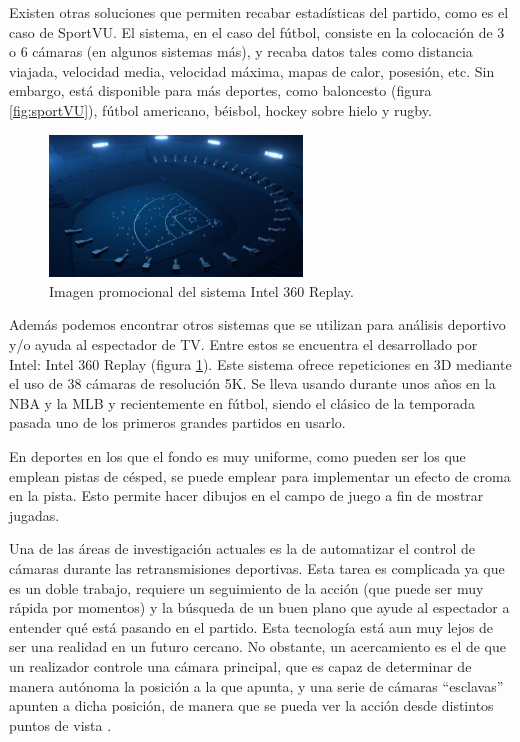 Existen otras soluciones que permiten recabar estadísticas del partido, como es el caso de SportVU. El sistema, en el caso del fútbol, consiste en la colocación de 3 o 6 cámaras (en algunos sistemas más), y recaba datos tales como distancia viajada, velocidad media, velocidad máxima, mapas de calor, posesión, etc. Sin embargo, está disponible para más deportes, como baloncesto  (figura \ref{fig:sportVU}), fútbol americano, béisbol, hockey sobre hielo y rugby.

\begin{figure}
    \centering
    \includegraphics[width=0.6\textwidth]{images/intel360}
    \caption{Imagen promocional del sistema Intel 360 Replay.}
    \label{fig:intel360}
\end{figure}

Además podemos encontrar otros sistemas que se utilizan para análisis deportivo y/o ayuda al espectador de TV. Entre estos se encuentra el desarrollado por Intel: Intel 360 Replay (figura \ref{fig:intel360}). Este sistema ofrece repeticiones en 3D mediante el uso de 38 cámaras de resolución 5K. Se lleva usando durante unos años en la NBA y la MLB y recientemente en fútbol, siendo el clásico de la temporada pasada uno de los primeros grandes partidos en usarlo.

En deportes en los que el fondo es muy uniforme, como pueden ser los que emplean pistas de césped, se puede emplear para implementar un efecto de croma en la pista. Esto permite hacer dibujos en el campo de juego a fin de mostrar jugadas.

Una de las áreas de investigación actuales es la de automatizar el control de cámaras durante las retransmisiones deportivas. Esta tarea es complicada ya que es un doble trabajo, requiere un seguimiento de la acción (que puede ser muy rápida por momentos) y la búsqueda de un buen plano que ayude al espectador a entender qué está pasando en el partido. Esta tecnología está aun muy lejos de ser una realidad en un futuro cercano. No obstante, un acercamiento es el de que un realizador controle una cámara principal, que es capaz de determinar de manera autónoma la posición a la que apunta, y una serie de cámaras ``esclavas'' apunten a dicha posición, de manera que se pueda ver la acción desde distintos puntos de vista \cite{book:cvInSports}.
\newpage